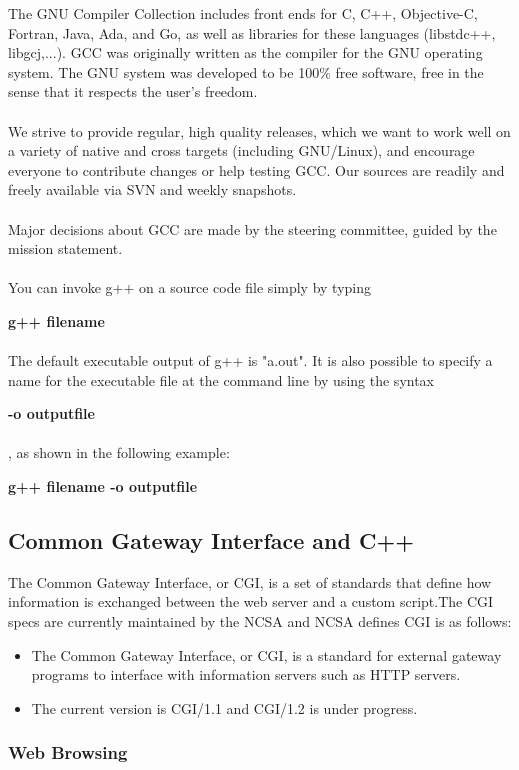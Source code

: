 The GNU Compiler Collection includes front ends for C, C++,
Objective-C, Fortran, Java, Ada, and Go, as well as libraries for
these languages (libstdc++, libgcj,...). GCC was originally written as
the compiler for the GNU operating system. The GNU system was
developed to be 100\% free software, free in the sense that it respects
the user's freedom.\\ \\
We strive to provide regular, high quality releases, which we want to
work well on a variety of native and cross targets (including
GNU/Linux), and encourage everyone to contribute changes or help
testing GCC. Our sources are readily and freely available via SVN and
weekly snapshots.\\ \\
Major decisions about GCC are made by the steering committee, guided
by the mission statement.\\ \\
You can invoke g++ on a source code file simply by typing

{\bf g++ filename}\\ \\
The default executable output of g++ is "a.out". It is also possible
to specify a name for the executable file at the command line by using
the syntax 

{\bf -o outputfile}\\ \\
, as shown in the following example: 

{\bf g++ filename -o outputfile}

\newpage
\subsection{Common Gateway Interface and C++}

The Common Gateway Interface, or CGI, is a set of standards that
define how information is exchanged between the web server and a
custom script.The CGI specs are currently maintained by the NCSA and
NCSA defines CGI is as follows:
\begin{itemize}
\item The Common Gateway Interface, or CGI, is a standard for external
gateway programs to interface with information servers such as HTTP
servers.
\item The current version is CGI/1.1 and CGI/1.2 is under progress.
\end{itemize}

\subsubsection{Web Browsing}

